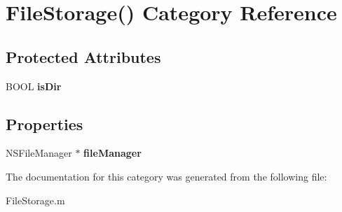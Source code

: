 \hypertarget{category_file_storage_07_08}{\section{File\-Storage() Category Reference}
\label{category_file_storage_07_08}
}
\subsection*{Protected Attributes}
\begin{DoxyCompactItemize}
\item 
\hypertarget{category_file_storage_07_08_a0fab9c6ba472bb67301dbe30ede7776d}{B\-O\-O\-L {\bfseries is\-Dir}}\label{category_file_storage_07_08_a0fab9c6ba472bb67301dbe30ede7776d}

\end{DoxyCompactItemize}
\subsection*{Properties}
\begin{DoxyCompactItemize}
\item 
\hypertarget{category_file_storage_07_08_affdd33cc18d80e661dd706456ef74cb0}{N\-S\-File\-Manager $\ast$ {\bfseries file\-Manager}}\label{category_file_storage_07_08_affdd33cc18d80e661dd706456ef74cb0}

\end{DoxyCompactItemize}


The documentation for this category was generated from the following file\-:\begin{DoxyCompactItemize}
\item 
File\-Storage.\-m\end{DoxyCompactItemize}
